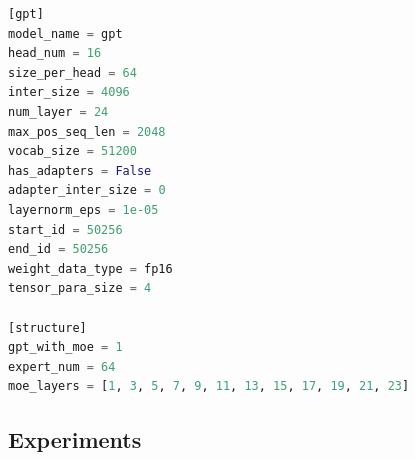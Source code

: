 \begin{lstlisting}[language=Python, caption=config.ini, breaklines=true, basicstyle=\footnotesize, frame=single, label=config-ini]
[gpt]
model_name = gpt
head_num = 16
size_per_head = 64
inter_size = 4096
num_layer = 24
max_pos_seq_len = 2048
vocab_size = 51200
has_adapters = False
adapter_inter_size = 0
layernorm_eps = 1e-05
start_id = 50256
end_id = 50256
weight_data_type = fp16
tensor_para_size = 4

[structure]
gpt_with_moe = 1
expert_num = 64
moe_layers = [1, 3, 5, 7, 9, 11, 13, 15, 17, 19, 21, 23]
\end{lstlisting}


\subsection{Experiments}
